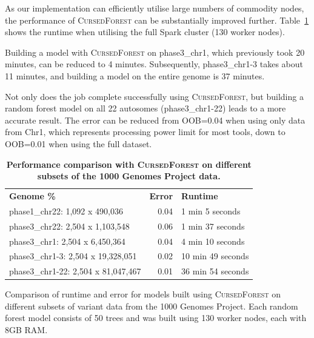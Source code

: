 \documentclass[10pt,letterpaper]{article}
\newlength\savedwidth
\newcommand\thickhline{\noalign{\global\savedwidth\arrayrulewidth\global\arrayrulewidth 2pt}%
\hline
\noalign{\global\arrayrulewidth\savedwidth}}
\newcommand{\cursedforest}{\textsc{CursedForest}\xspace}
\begin{document}
As our implementation can efficiently utilise large numbers of commodity nodes, the performance of \cursedforest can be substantially improved further. 
Table~\ref{cursedforesttable} shows the runtime when utilising the full Spark cluster (130 worker nodes). 

Building a model with \cursedforest on phase3\_chr1, which previously took 20 minutes, can be reduced to 4 minutes. 
Subsequently, phase3\_chr1-3 takes about 11 minutes, and building a
model on the entire genome is 37 minutes. 

Not only does the job complete successfully using \cursedforest, but building a random
forest model on all 22 autosomes (phase3\_chr1-22)  leads to a more accurate result. 
The error can be reduced from OOB=0.04 when using only data from Chr1, which represents processing power limit for most tools, down to OOB=0.01 when using the full dataset. 


\begin{table}[!ht]
\begin{minipage}{\textwidth}
\centering
\caption{ {\bf Performance comparison with \cursedforest on different subsets of the 1000 Genomes Project data.}}
\begin{tabular}{| l | r | l |}
\hline
{\bf Genome \%} & {\bf Error} & {\bf Runtime} \\ \thickhline
phase1\_chr22: 1,092 x 490,036 & 0.04 & 1 min 5 seconds \\ \hline
phase3\_chr22: 2,504 x 1,103,548 & 0.06 & 1 min 37 seconds \\ \hline
phase3\_chr1: 2,504 x 6,450,364 & 0.04 & 4 min 10 seconds \\ \hline
phase3\_chr1-3: 2,504 x 19,328,051 & 0.02 & 10 min 49 seconds \\ \hline
phase3\_chr1-22: 2,504 x 81,047,467 & 0.01 & 36 min 54 seconds \\ \hline
\end{tabular}
\begin{flushleft} 
Comparison of runtime and error for models built using \cursedforest on different subsets of variant data 
from the 1000 Genomes Project.
Each random forest model consists of 50 trees and was built using 130 worker nodes, each with 8GB RAM.
\end{flushleft}
\label{cursedforesttable}
\end{minipage}
\end{table}
\end{document}
